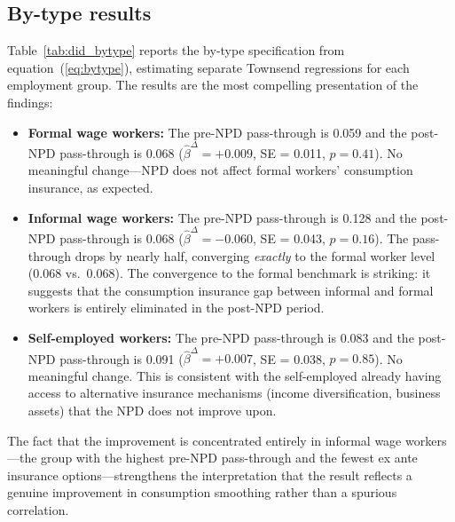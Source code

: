 \documentclass[12pt]{article}
\begin{document}
\subsection{By-type results}

Table~\ref{tab:did_bytype} reports the by-type specification from equation~(\ref{eq:bytype}), estimating separate Townsend regressions for each employment group. The results are the most compelling presentation of the findings:

\begin{itemize}
\item \textbf{Formal wage workers:} The pre-NPD pass-through is 0.059 and the post-NPD pass-through is 0.068 ($\hat{\beta}^{\Delta} = +0.009$, SE = 0.011, $p = 0.41$). No meaningful change---NPD does not affect formal workers' consumption insurance, as expected.

\item \textbf{Informal wage workers:} The pre-NPD pass-through is 0.128 and the post-NPD pass-through is 0.068 ($\hat{\beta}^{\Delta} = -0.060$, SE = 0.043, $p = 0.16$). The pass-through drops by nearly half, converging \textit{exactly} to the formal worker level (0.068 vs.\ 0.068). The convergence to the formal benchmark is striking: it suggests that the consumption insurance gap between informal and formal workers is entirely eliminated in the post-NPD period.

\item \textbf{Self-employed workers:} The pre-NPD pass-through is 0.083 and the post-NPD pass-through is 0.091 ($\hat{\beta}^{\Delta} = +0.007$, SE = 0.038, $p = 0.85$). No meaningful change. This is consistent with the self-employed already having access to alternative insurance mechanisms (income diversification, business assets) that the NPD does not improve upon.
\end{itemize}

\noindent The fact that the improvement is concentrated entirely in informal wage workers---the group with the highest pre-NPD pass-through and the fewest ex ante insurance options---strengthens the interpretation that the result reflects a genuine improvement in consumption smoothing rather than a spurious correlation.
\end{document}
